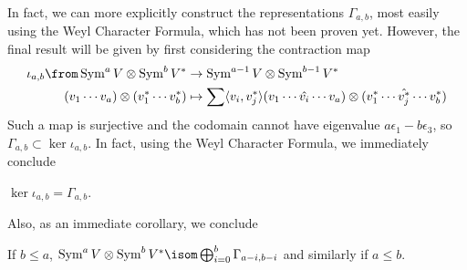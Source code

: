 \documentclass[11pt,leqno,oneside]{amsart}
\numberwithin{thm}{section}
\begin{document}
In fact, we can more explicitly construct the representations
\(\Gamma_{a,b}\), most easily using the Weyl Character Formula, which
has not been proven yet. However, the final result will be given by
first considering the contraction map
\begin{align*}
    \iota_{a,b} \from \operatorname{Sym}^a V \otimes
  \operatorname{Sym}^b V^*
  & \to \operatorname{Sym}^{a-1} V \otimes \operatorname{Sym}^{b-1} V^* \\
  (v_1 \cdots v_a) \otimes (v_1^* \cdots v_b^*)
  & \mapsto \sum \langle v_i, v_j^* \rangle(v_1 \cdots \hat{v_i}
    \cdots v_a) \otimes (v_1^* \cdots \hat{v_j^*} \cdots v_b^*)
\end{align*}
Such a map is surjective and the codomain cannot have eigenvalue \(a
\epsilon_1 - b \epsilon_3\), so \(\Gamma_{a,b} \subset \ker
\iota_{a,b}\). In fact, using the Weyl Character Formula, we
immediately conclude
\begin{prop}
  \(\ker \iota_{a,b} = \Gamma_{a,b}\).
\end{prop}
Also, as an immediate corollary, we conclude
\begin{cor}
  If \(b \leq a\), \(\operatorname{Sym}^a V \otimes
  \operatorname{Sym}^b V^* \isom \bigoplus_{i=0}^b \Gamma_{a-i,b-i}\)
  and similarly if \(a \leq b\).
\end{cor}
\end{document}
